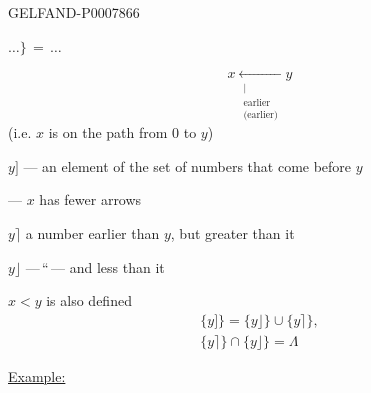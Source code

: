 \begin{GelfandAdjacentEvidence}{GELFAND-P000786}{6}


\(\ldots\}\,=\,\ldots\)
\end{GelfandAdjacentEvidence}


\[
x\underset{\substack{\vert\\\text{earlier}\\\text{(earlier)}}}{\longleftarrow}y
\]
(i.e. \(x\) is on the path from \(0\) to \(y\))

\(y]\) --- an element of the set of numbers that come before \(y\)

 --- \(x\) has fewer arrows

\(y\rceil\) a number earlier than \(y\), but greater than it

\(y\rfloor\) ---\,\textquotedblleft\,--- and less than it

\(x<y\) is also defined
\begin{gather*}
\{y]\}=\{y\rfloor\}\cup\{y\rceil\},\\
\{y\rceil\}\cap\{y\rfloor\}=\Lambda
\end{gather*}

\underline{Example:}



